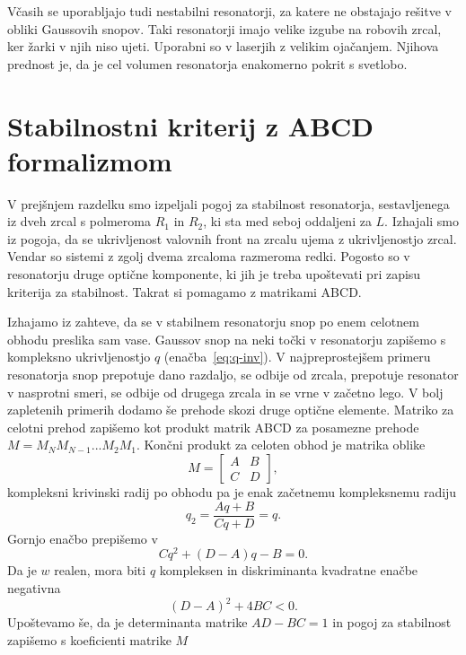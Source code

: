 \begin{remark}
Včasih se uporabljajo tudi nestabilni resonatorji, za 
katere ne obstajajo rešitve v obliki Gaussovih snopov. Taki resonatorji 
imajo velike izgube na robovih zrcal, ker žarki v njih niso ujeti. 
Uporabni so v laserjih z velikim ojačanjem. Njihova prednost je, da je cel
volumen resonatorja enakomerno pokrit s svetlobo.
\end{remark}

\section{Stabilnostni kriterij z ABCD formalizmom}
V prejšnjem razdelku smo izpeljali pogoj za stabilnost resonatorja, 
sestavljenega iz dveh zrcal s polmeroma $R_1$ in $R_2$, ki sta med 
seboj oddaljeni za $L$. Izhajali smo iz pogoja, da se ukrivljenost
valovnih front na zrcalu ujema z ukrivljenostjo zrcal. Vendar so sistemi z
zgolj dvema zrcaloma razmeroma redki. Pogosto so v resonatorju
druge optične komponente, ki jih je treba upoštevati pri zapisu
kriterija za stabilnost. Takrat si pomagamo z matrikami ABCD. 

Izhajamo iz zahteve, da se v stabilnem resonatorju snop po enem celotnem obhodu
preslika sam vase. Gaussov snop na neki točki v resonatorju 
zapišemo s kompleksno ukrivljenostjo $q$ (enačba~\ref{eq:q-inv}).
V najpreprostejšem primeru resonatorja snop prepotuje dano razdaljo, se odbije od zrcala, prepotuje
resonator v nasprotni smeri, se odbije od drugega zrcala in se vrne v začetno lego. V bolj 
zapletenih primerih dodamo še prehode skozi druge optične elemente. Matriko 
za celotni prehod zapišemo kot produkt matrik ABCD za posamezne prehode $M = M_N M_{N-1} ...M_2 M_1$.
Končni produkt za celoten obhod je matrika oblike
\begin{equation}
M = \left[\begin{array}{cc}
A & B\\
C & D
\end{array}\right],
\end{equation}
kompleksni krivinski radij po obhodu pa je enak začetnemu kompleksnemu radiju
\begin{equation}
q_2 = \frac{Aq+B}{Cq+D} = q.
\end{equation}
Gornjo enačbo prepišemo v 
\begin{equation}
Cq^2+(D-A)q-B=0.
\end{equation}
Da je $w$ realen, mora biti $q$ kompleksen in diskriminanta kvadratne enačbe negativna
\begin{equation}
(D-A)^2+ 4BC<0.
\end{equation}
Upoštevamo še, da je determinanta matrike $AD-BC=1$ in pogoj za 
stabilnost zapišemo s koeficienti matrike $M$

